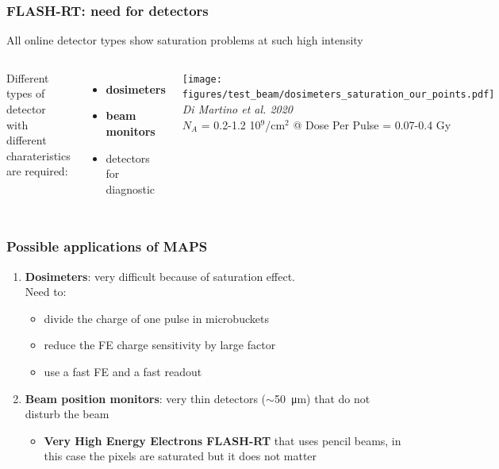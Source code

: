     \begin{frame}[noframenumbering]
        \frametitle{FLASH-RT: need for detectors}
        All online detector types show saturation problems at such high intensity
        \medskip
        \begin{columns}
            Different types of detector with different charateristics are required: 
                \begin{itemize}
                    \item \textbf{dosimeters} 
                    \item \textbf{beam monitors} 
                    \item detectors for diagnostic 
                \end{itemize}
                \hspace*{-0.6cm}
                \texttt{[image: figures/test\_beam/dosimeters\_saturation\_our\_points.pdf]}
                \centering\textit{Di Martino et al. 2020}\\\bigskip
                \hspace*{-3.cm}$N_A$ = 0.2-1.2 10$^9$/cm$^2$ @ Dose Per Pulse = 0.07-0.4 Gy
        \end{columns}
    \end{frame}   

    

    \begin{frame}
        \frametitle{Possible applications of MAPS}
        \begin{enumerate}
            \item \textbf{Dosimeters}: very difficult because of saturation effect. \\
            Need to: 
            \begin{itemize}
                \item divide the charge of one pulse in microbuckets
                \item reduce the FE charge sensitivity by large factor 
                \item use a fast FE and a fast readout
            \end{itemize}
            \bigskip
            \item \textbf{Beam position monitors}: very thin detectors ($\sim$\SI{50}{\um}) that do not disturb the beam
                \begin{itemize}
                    \item \textbf{Very High Energy Electrons FLASH-RT} that uses pencil beams, in this case the pixels are saturated but it does not matter
                \end{itemize}
        \end{enumerate}
    \end{frame}     


